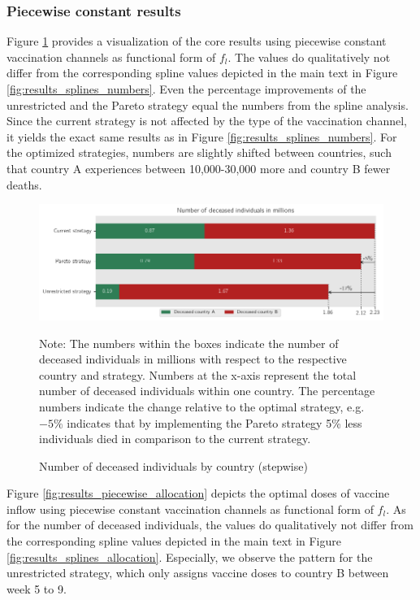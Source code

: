 \subsubsection{Piecewise constant results}
\label{A:piecewise}
Figure \ref{fig:results_piecewise_numbers} provides a visualization of the core results using piecewise constant vaccination channels as functional form of $f_l$. The values do qualitatively not differ from the corresponding spline values depicted in the main text in Figure \ref{fig:results_splines_numbers}. Even the percentage improvements of the unrestricted and the Pareto strategy equal the numbers from the spline analysis. Since the current strategy is not affected by the type of the vaccination channel, it yields the exact same results as in Figure \ref{fig:results_splines_numbers}. For the optimized strategies, numbers are slightly shifted between countries, such that country A experiences between 10,000-30,000 more and country B fewer deaths. 
\begin{figure}[h!]
\centering
\includegraphics[scale=0.65]{images/piecewise_percentage_deviation.png}
\begin{flushleft}
\scriptsize{Note: The numbers within the boxes indicate the number of deceased individuals in millions with respect to the respective country and strategy. Numbers at the x-axis represent the total number of deceased individuals within one country. The percentage numbers indicate the change relative to the optimal strategy, e.g. $-5\%$ indicates that by implementing the Pareto strategy 5\% less individuals died in comparison to the current strategy.}
\end{flushleft}
\caption{Number of deceased individuals by country (stepwise)}
\label{fig:results_piecewise_numbers}
\end{figure}
Figure \ref{fig:results_piecewise_allocation} depicts the optimal doses of vaccine inflow using piecewise constant vaccination channels as functional form of $f_l$. As for the number of deceased individuals, the values do qualitatively not differ from the corresponding spline values depicted in the main text in Figure \ref{fig:results_splines_allocation}. Especially, we observe the pattern for the unrestricted strategy, which only assigns vaccine doses to country B between week 5 to 9. %

